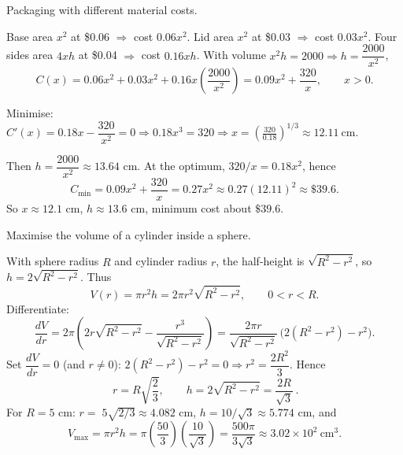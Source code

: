 \documentclass[11pt]{article}
\def\textbf#1{#1}%
\begin{document}
\begin{solution}
\textbf{Packaging with different material costs.}

Base area \(x^{2}\) at \$0.06 \(\Rightarrow\) cost \(0.06x^{2}\).  
Lid area \(x^{2}\) at \$0.03 \(\Rightarrow\) cost \(0.03x^{2}\).  
Four sides area \(4xh\) at \$0.04 \(\Rightarrow\) cost \(0.16xh\).  
With volume \(x^{2}h=2000\Rightarrow h=\dfrac{2000}{x^{2}}\),
\[
C(x)=0.06x^{2}+0.03x^{2}+0.16x\left(\frac{2000}{x^{2}}\right)
     =0.09x^{2}+\frac{320}{x},\qquad x>0.
\]

Minimise: \(C'(x)=0.18x-\dfrac{320}{x^{2}}=0
\Rightarrow 0.18x^{3}=320\Rightarrow x=\left(\frac{320}{0.18}\right)^{1/3}\approx 12.11\ \text{cm}.\)

Then \(h=\dfrac{2000}{x^{2}}\approx 13.64\) cm.  
At the optimum, \(320/x=0.18x^{2}\), hence
\[
C_{\min}=0.09x^{2}+\frac{320}{x}=0.27x^{2}
       \approx 0.27(12.11)^{2}\approx \$39.6.
\]
So \(x\approx 12.1\) cm, \(h\approx 13.6\) cm, minimum cost about \(\$39.6\).
\end{solution}

\begin{solution}
\textbf{Maximise the volume of a cylinder inside a sphere.}

With sphere radius \(R\) and cylinder radius \(r\), the half-height is
\(\sqrt{R^{2}-r^{2}}\), so \(h=2\sqrt{R^{2}-r^{2}}\).  
Thus
\[
V(r)=\pi r^{2}h=2\pi r^{2}\sqrt{R^{2}-r^{2}},\qquad 0<r<R.
\]
Differentiate:
\[
\frac{dV}{dr}=2\pi\!\left(2r\sqrt{R^{2}-r^{2}}-\frac{r^{3}}{\sqrt{R^{2}-r^{2}}}\right)
             =\frac{2\pi r}{\sqrt{R^{2}-r^{2}}}\,\big(2(R^{2}-r^{2})-r^{2}\big).
\]
Set \(\dfrac{dV}{dr}=0\) (and \(r\ne 0\)): \(2(R^{2}-r^{2})-r^{2}=0\Rightarrow r^{2}=\dfrac{2R^{2}}{3}\).
Hence
\[
\boxed{\,r=R\sqrt{\frac{2}{3}},\qquad 
h=2\sqrt{R^{2}-r^{2}}=\frac{2R}{\sqrt{3}}\, }.
\]
For \(R=5\) cm: \(r=\;5\sqrt{2/3}\approx 4.082\) cm, \(h=10/\sqrt{3}\approx 5.774\) cm, and
\[
V_{\max}=\pi r^{2}h=\pi\left(\frac{50}{3}\right)\!\left(\frac{10}{\sqrt{3}}\right)
=\frac{500\pi}{3\sqrt{3}}\approx 3.02\times 10^{2}\ \text{cm}^{3}.
\]
\end{solution}
\end{document}
